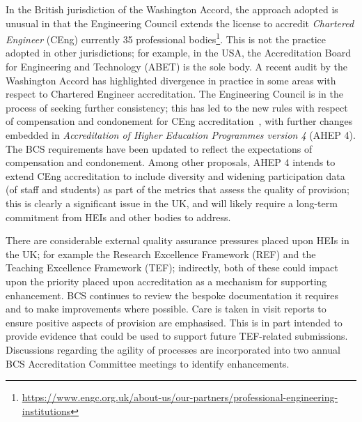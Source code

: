 \documentclass[sigconf]{acmart}
\begin{document}
In the British jurisdiction of the Washington Accord, the approach
adopted is unusual in that the Engineering Council extends the license
to accredit {\emph{Chartered Engineer}} (CEng) currently 35 
professional bodies\footnote{\url{https://www.engc.org.uk/about-us/our-partners/professional-engineering-institutions}}. This is not the practice adopted in
other jurisdictions; for example, in the USA, the Accreditation Board
for Engineering and Technology (ABET) is the sole body. A recent audit
by the Washington Accord has highlighted divergence in practice in
some areas with respect to Chartered Engineer accreditation. The
Engineering Council is in the process of seeking further consistency;
this has led to the new rules with respect of compensation and
condonement for CEng accreditation~\cite{EC2018}, with further changes
embedded in {\emph{Accreditation of Higher Education Programmes
version 4}} (AHEP 4). The BCS requirements have been updated to
reflect the expectations of compensation and condonement. Among other
proposals, AHEP 4 intends to extend CEng accreditation to include
diversity and widening participation data (of staff and students) as
part of the metrics that assess the quality of provision; this is
clearly a significant issue in the UK, and will likely require a
long-term commitment from HEIs and other bodies to address.

There are considerable external quality assurance
pressures placed upon HEIs in the UK; for example the Research
Excellence Framework (REF) and the Teaching Excellence Framework
(TEF); indirectly, both of these could impact upon the priority placed
upon accreditation as a mechanism for supporting enhancement. BCS
continues to review the bespoke documentation it requires and to make
improvements where possible. Care is taken in visit reports to ensure
positive aspects of provision are emphasised. This is in part intended
to provide evidence that could be used to support future TEF-related
submissions. Discussions regarding the agility of processes are
incorporated into two annual BCS Accreditation Committee meetings to
identify enhancements.
\end{document}
